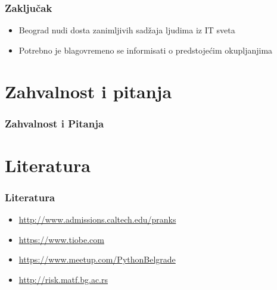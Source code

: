 \documentclass[hyperref={bookmarks=false},aspectratio=169]{beamer}
\begin{document}
\begin{frame}
\frametitle{Zaključak}

\begin{itemize}
    \item Beograd nudi dosta zanimljivih sadžaja ljudima iz IT sveta
    \item Potrebno je blagovremeno se informisati o predstojećim okupljanjima
\end{itemize}

\end{frame}

\section{Zahvalnost i pitanja}

\begin{frame}
\frametitle{Zahvalnost i Pitanja}
\end{frame}

\section{Literatura}
\begin{frame}
\frametitle{Literatura}
\begin{itemize}
    \item \small{\url{http://www.admissions.caltech.edu/pranks}}
    \item \small{\url{https://www.tiobe.com}}
    \item \small{\url{https://www.meetup.com/PythonBelgrade}}
    \item \small{\url{http://risk.matf.bg.ac.rs}}
\end{itemize}

\end{frame}

% 
% 
% 



\end{document}
